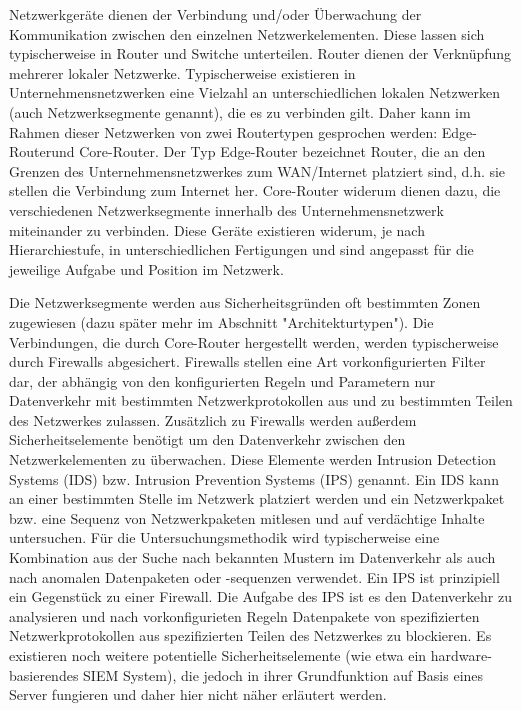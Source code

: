 Netzwerkgeräte dienen der Verbindung und/oder Überwachung der Kommunikation zwischen den einzelnen Netzwerkelementen. Diese lassen sich typischerweise in Router und Switche unterteilen. Router dienen der Verknüpfung mehrerer lokaler Netzwerke. Typischerweise existieren in Unternehmensnetzwerken eine Vielzahl an unterschiedlichen lokalen Netzwerken (auch Netzwerksegmente genannt), die es zu verbinden gilt. Daher kann im Rahmen dieser Netzwerken von zwei Routertypen gesprochen werden: \glqq Edge-Router\grqq  und \glqq Core-Router\grqq . Der Typ Edge-Router bezeichnet Router, die an den Grenzen des Unternehmensnetzwerkes zum WAN/Internet platziert sind, d.h. sie stellen die Verbindung zum Internet her. Core-Router widerum dienen dazu, die verschiedenen Netzwerksegmente innerhalb des Unternehmensnetzwerk miteinander zu verbinden. Diese Geräte existieren widerum, je nach Hierarchiestufe, in unterschiedlichen Fertigungen und sind angepasst für die jeweilige Aufgabe und Position im Netzwerk. 

Die Netzwerksegmente werden aus Sicherheitsgründen oft bestimmten Zonen zugewiesen (dazu später mehr im Abschnitt "Architekturtypen"). Die Verbindungen, die durch Core-Router hergestellt werden, werden typischerweise durch Firewalls abgesichert. Firewalls stellen eine Art vorkonfigurierten Filter dar, der abhängig von den konfigurierten Regeln und Parametern nur Datenverkehr mit bestimmten Netzwerkprotokollen aus und zu bestimmten Teilen des Netzwerkes zulassen.
Zusätzlich zu Firewalls werden außerdem Sicherheitselemente benötigt um den Datenverkehr zwischen den Netzwerkelementen zu überwachen. Diese Elemente werden Intrusion Detection Systems (IDS) bzw. Intrusion Prevention Systems (IPS) genannt. Ein IDS kann an einer bestimmten Stelle im Netzwerk platziert werden und ein Netzwerkpaket bzw. eine Sequenz von Netzwerkpaketen mitlesen und auf verdächtige Inhalte untersuchen. Für die Untersuchungsmethodik wird typischerweise eine Kombination aus der Suche nach bekannten Mustern im Datenverkehr als auch nach anomalen Datenpaketen oder -sequenzen verwendet.
Ein IPS ist prinzipiell ein Gegenstück zu einer Firewall. Die Aufgabe des IPS ist es den Datenverkehr zu analysieren und nach vorkonfigurieten Regeln Datenpakete von spezifizierten Netzwerkprotokollen aus spezifizierten Teilen des Netzwerkes zu blockieren.
Es existieren noch weitere potentielle Sicherheitselemente (wie etwa ein hardware-basierendes SIEM System), die jedoch in ihrer Grundfunktion auf Basis eines Server fungieren und daher hier nicht näher erläutert werden.

